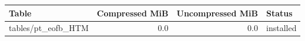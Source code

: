 {\small
\begin{tabular}{lrrl}
\hline
Table & Compressed MiB & Uncompressed MiB & Status \\
\hline
tables/pt\_eofb\_HTM & 0.0 & 0.0 & installed \\
\hline
\end{tabular}
}
